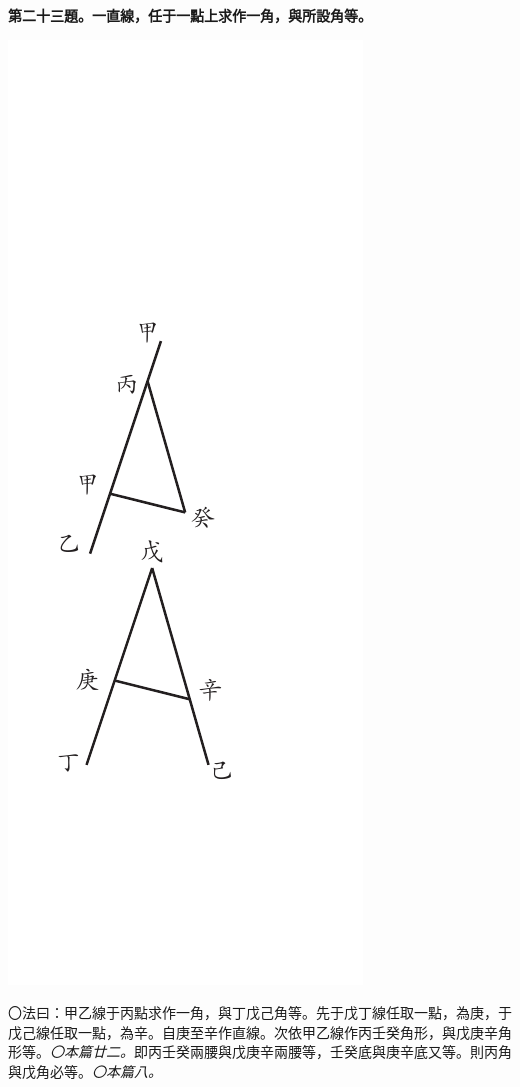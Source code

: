 \documentclass[12pt,b5paper,landscape]{article}
\newcommand{\ccom}[1]{{\footnotesize \emph{〇#1}}}
\newcommand{\bcom}[1]{〇#1}
\newcommand{\cthm}[1]{{
\vspace{8pt}

\bfseries #1}}
\begin{document}
\begin{multicols}{2}
\cthm{第二十三題。一直線，任于一點上求作一角，與所設角等。}
\begin{center}
    \includegraphics[angle=90]{eu69}
\end{center}
\bcom{法曰：甲乙線于丙點求作一角，與丁戊己角等。先于戊丁線任取一點，為庚，于戊己線任取一點，為辛。自庚至辛作直線。次依甲乙線作丙壬癸角形，與戊庚辛角形等。\ccom{本篇廿二。}即丙壬癸兩腰與戊庚辛兩腰等，壬癸底與庚辛底又等。則丙角與戊角必等。\ccom{本篇八。}}


\end{multicols}
\end{document}
